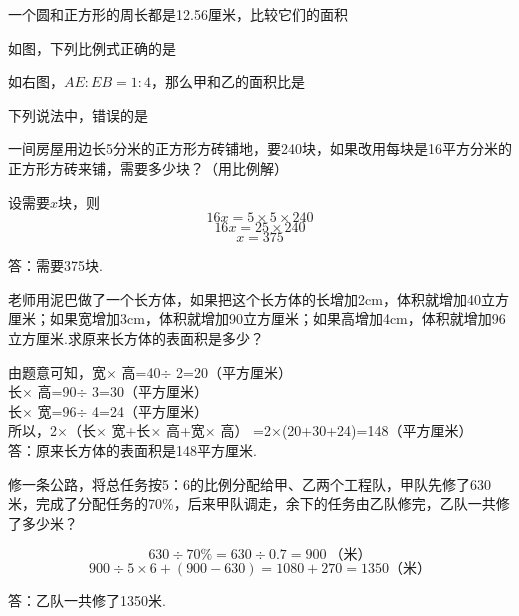 \documentclass[marginline,answers]{BHCexam}
\begin{document}
\begin{questions}

\question 一个圆和正方形的周长都是12.56厘米，比较它们的面积


\question 如图，下列比例式正确的是


\question 如右图，$AE:EB=1:4$，那么甲和乙的面积比是


\question 下列说法中，错误的是




\jiandaa
\question[4] 一间房屋用边长5分米的正方形方砖铺地，要240块，如果改用每块是16平方分米的正方形方砖来铺，需要多少块？（用比例解）

\begin{solution}{\cyan
设需要$x$块，则
\[16x=5\times 5\times 240 \]
\[16x=25\times 240\]
\[x=375\]

答：需要375块.}
\end{solution}

\question[5] 老师用泥巴做了一个长方体，如果把这个长方体的长增加2cm，体积就增加40立方厘米；如果宽增加3cm，体积就增加90立方厘米；如果高增加4cm，体积就增加96立方厘米.求原来长方体的表面积是多少？

\begin{solution}{\cyan
	由题意可知，宽$\times$ 高=40$\div$ 2=20（平方厘米）\\
	长$\times$ 高=90$\div$ 3=30（平方厘米）\\
	长$\times$ 宽=96$\div$ 4=24（平方厘米）\\
	所以，2$\times$（长$\times$ 宽+长$\times$ 高+宽$\times$ 高）
	=2$\times$(20+30+24)=148（平方厘米）\\
	答：原来长方体的表面积是148平方厘米.}
\end{solution}


\jiandab
\question[5] 修一条公路，将总任务按5：6的比例分配给甲、乙两个工程队，甲队先修了630米，完成了分配任务的70\%，后来甲队调走，余下的任务由乙队修完，乙队一共修了多少米？

\begin{solution}{\cyan
\[630\div 70\%=630\div 0.7=900~\text{（米）}\]
\[900\div 5\times 6+(900-630)=1080+270=1350\text{（米）}\]

答：乙队一共修了1350米.}
\end{solution}



\end{questions}
\end{document}
